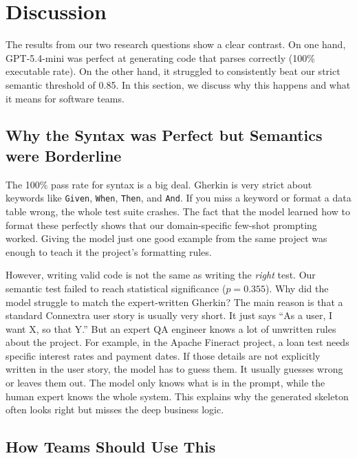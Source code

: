 
\section{Discussion}
\label{sec:discussion}

The results from our two research questions show a clear contrast. On one hand, GPT-5.4-mini was perfect at generating code that parses correctly (100\% executable rate). On the other hand, it struggled to consistently beat our strict semantic threshold of 0.85. In this section, we discuss why this happens and what it means for software teams.

\subsection{Why the Syntax was Perfect but Semantics were Borderline}

The 100\% pass rate for syntax is a big deal. Gherkin is very strict about keywords like \texttt{Given}, \texttt{When}, \texttt{Then}, and \texttt{And}. If you miss a keyword or format a data table wrong, the whole test suite crashes. The fact that the model learned how to format these perfectly shows that our domain-specific few-shot prompting worked. Giving the model just one good example from the same project was enough to teach it the project's formatting rules.

However, writing valid code is not the same as writing the \textit{right} test. Our semantic test failed to reach statistical significance ($p = 0.355$). Why did the model struggle to match the expert-written Gherkin? The main reason is that a standard Connextra user story is usually very short. It just says ``As a user, I want X, so that Y.'' But an expert QA engineer knows a lot of unwritten rules about the project. For example, in the Apache Fineract project, a loan test needs specific interest rates and payment dates. If those details are not explicitly written in the user story, the model has to guess them. It usually guesses wrong or leaves them out. The model only knows what is in the prompt, while the human expert knows the whole system. This explains why the generated skeleton often looks right but misses the deep business logic.

\subsection{How Teams Should Use This}

